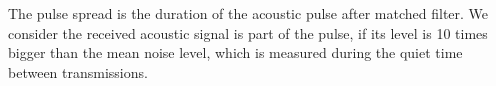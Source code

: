 \begin{enumerate}
The pulse spread is the duration of the acoustic pulse after matched filter. We consider the received acoustic signal is part of the pulse, if its level is 10 times bigger than the mean noise level, which is measured during the quiet time between transmissions.

\end{enumerate}
%
%

